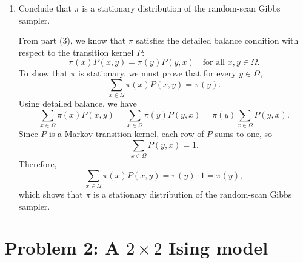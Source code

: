 \documentclass[answers,12pt,addpoints]{exam}
\begin{document}
\begin{enumerate}
\begin{solution}
\medskip
\noindent\textbf{Case 3: $x$ and $y$ differ in exactly one coordinate.}
Suppose $x$ and $y$ differ only in the $i$-th coordinate, and that
$x_{-i} = y_{-i}$. By part (2),
\[
P(x,y) = \frac{1}{d} \,\pi(y_i \mid x_{-i}),
\qquad
P(y,x) = \frac{1}{d} \,\pi(x_i \mid y_{-i}).
\]
Since $x_{-i} = y_{-i}$, we use the definition of conditional probability to write
\[
\pi(y_i \mid x_{-i})
= \frac{\pi(y_i,\, x_{-i})}{\pi(x_{-i})}
= \frac{\pi(y)}{\pi(x_{-i})},
\qquad
\pi(x_i \mid y_{-i})
= \frac{\pi(x_i,\, y_{-i})}{\pi(y_{-i})}
= \frac{\pi(x)}{\pi(y_{-i})}.
\]
Substituting $y_{-i} = x_{-i}$ in the second expression,
\[
\pi(y_i \mid x_{-i}) = \frac{\pi(y)}{\pi(x_{-i})},
\qquad
\pi(x_i \mid y_{-i}) = \frac{\pi(x)}{\pi(x_{-i})}.
\]
Therefore,
\[
\pi(x)\,P(x,y)
= \pi(x)\cdot\frac{1}{d}\cdot\frac{\pi(y)}{\pi(x_{-i})}
= \frac{\pi(x)\,\pi(y)}{d\,\pi(x_{-i})},
\]
and
\[
\pi(y)\,P(y,x)
= \pi(y)\cdot\frac{1}{d}\cdot\frac{\pi(x)}{\pi(x_{-i})}
= \frac{\pi(x)\,\pi(y)}{d\,\pi(x_{-i})}.
\]
These two expressions are equal, hence
\[
\pi(x) P(x,y) = \pi(y) P(y,x)
\]
whenever $x$ and $y$ differ in exactly one coordinate.

\medskip
Combining the three cases, we conclude that the random-scan Gibbs sampler
satisfies the detailed balance condition with respect to $\pi$.
\end{solution}
\item Conclude that $\pi$ is a stationary distribution of the random-scan Gibbs sampler.
\begin{solution}
From part (3), we know that $\pi$ satisfies the detailed balance condition
with respect to the transition kernel $P$:
\[
\pi(x) P(x,y) = \pi(y) P(y,x)
\quad \text{for all } x,y \in \Omega.
\]
To show that $\pi$ is stationary, we must prove that for every $y \in \Omega$,
\[
\sum_{x \in \Omega} \pi(x) P(x,y) = \pi(y).
\]
Using detailed balance, we have
\[
\sum_{x \in \Omega} \pi(x) P(x,y)
= \sum_{x \in \Omega} \pi(y) P(y,x)
= \pi(y) \sum_{x \in \Omega} P(y,x).
\]
Since $P$ is a Markov transition kernel, each row of $P$ sums to one, so
\[
\sum_{x \in \Omega} P(y,x) = 1.
\]
Therefore,
\[
\sum_{x \in \Omega} \pi(x) P(x,y)
= \pi(y) \cdot 1
= \pi(y),
\]
which shows that $\pi$ is a stationary distribution of the random-scan Gibbs
sampler.
\end{solution}
\end{enumerate}

\section*{Problem 2: A $2\times 2$ Ising model}
\end{document}
